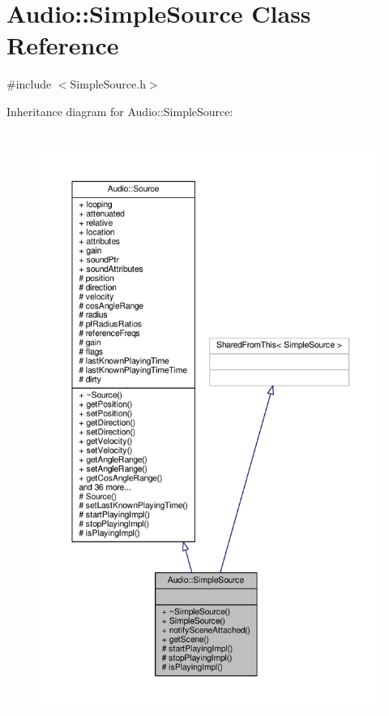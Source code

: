 \hypertarget{classAudio_1_1SimpleSource}{}\section{Audio\+:\+:Simple\+Source Class Reference}
\label{classAudio_1_1SimpleSource}


{\ttfamily \#include $<$Simple\+Source.\+h$>$}



Inheritance diagram for Audio\+:\+:Simple\+Source\+:
\nopagebreak
\begin{figure}[H]
\begin{center}
\leavevmode
\includegraphics[height=550pt]{d9/d37/classAudio_1_1SimpleSource__inherit__graph}
\end{center}
\end{figure}


